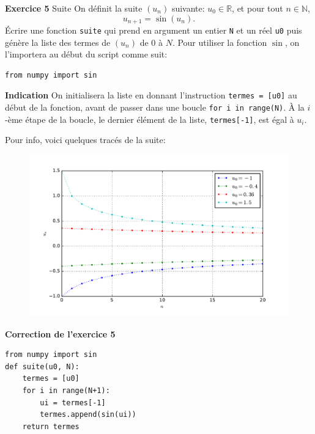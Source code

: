 \documentclass[10pt,xcolor={dvipsnames}]{beamer}
\newcounter{Exercice}
\begin{document}
\begin{frame}[fragile]
\begin{block}{\textbf{Exercice 5} Suite}
On définit la suite $(u_n)$ suivante: $u_0\in\mathbb{R}$, et pour tout $n\in\mathbb{N}$, \[u_{n+1} = \sin(u_n).\]
\pause
Écrire une fonction \lstinline|suite| qui prend en argument un entier \lstinline|N| et un réel \lstinline|u0| puis génère la liste des termes de $(u_n)$ de $0$ à $N$.
\pause
Pour utiliser la fonction $\sin$, on l'importera au début du script comme suit:
\begin{lstlisting}
from numpy import sin
\end{lstlisting}
\pause

\textbf{Indication} On initialisera la liste en donnant l'instruction \lstinline|termes = [u0]| au début de la fonction, avant de passer dans une boucle \lstinline|for i in range(N)|. À la  $i$-ème étape de la boucle, le dernier élément de la liste, \lstinline|termes[-1]|, est égal à $u_i$.

\end{block}
\end{frame}

\begin{frame}
Pour info, voici quelques tracés de la suite:
\begin{figure}
\centering
\includegraphics[width=\textwidth]{chope.pdf}
\end{figure}
\end{frame}

\begin{frame}[fragile]
\begin{block}{\textbf{Correction de l'exercice 5}}
\begin{lstlisting}from numpy import sin
def suite(u0, N):
    termes = [u0]
    for i in range(N+1):
        ui = termes[-1]
        termes.append(sin(ui))
    return termes\end{lstlisting}
\end{block}
\end{frame}
\end{document}
